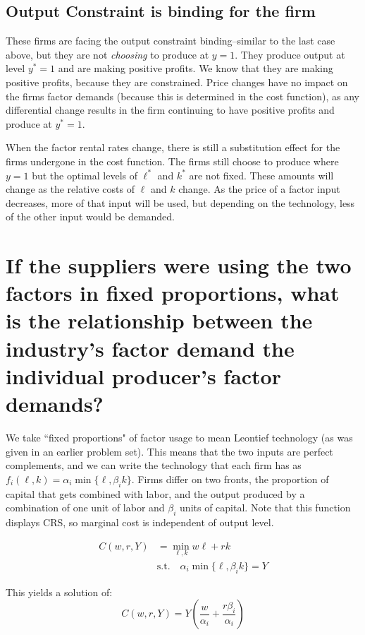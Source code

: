 \documentclass[12pt]{paper}
\begin{document}
\subsection*{Output Constraint is binding for the firm}

These firms are facing the output constraint binding--similar to the last case above, but they are not \textit{choosing} to produce at $y=1$. They produce
output at level $y^{*} = 1$ and are making positive profits. We know that they are making positive profits, because they are constrained. Price
changes have no impact on the firms factor demands (because this is determined in the cost function), as any
differential change results in the firm continuing to have positive
profits and produce at $y^{*} = 1$.

When the factor rental rates change, there is still a substitution
effect for the firms undergone in the cost function. The firms still
choose to produce where $y=1$ but the optimal levels of $\ell^{*}$ and
$k^{*}$ are not fixed. These amounts will change as the relative costs
of $\ell$ and $k$ change. As the price of a factor input decreases, more
of that input will be used, but depending on the technology,
less of the other input would be demanded.

\section*{If the suppliers were using the two factors in fixed
  proportions, what is the relationship between the industry's factor
  demand the individual producer's factor demands?}

We take ``fixed proportions" of factor usage to mean Leontief technology (as was given in an earlier problem set). This means
that the two inputs are perfect complements, and we can write the
technology that each firm has as $f_i(\ell,k) = \alpha_i \min \{ \ell, \beta_i k
\}$. Firms differ on two fronts, the proportion of capital that gets
combined with labor, and the output produced by a combination of one
unit of labor and $\beta_i$ units of capital. Note that this function
displays CRS, so marginal cost is independent of output level.

\begin{align*}
  C(w,r,Y) &= \min_{\ell,k} w \ell + r k \\
  &\text{s.t.} \quad \alpha_i \min \{ \ell, \beta_i k \} = Y
\end{align*}

This yields a solution of:
\begin{equation*}
  C(w,r,Y) = Y \left( \frac{w}{\alpha_i} + \frac{r \beta_i}{\alpha_i} \right)
\end{equation*}
\end{document}
